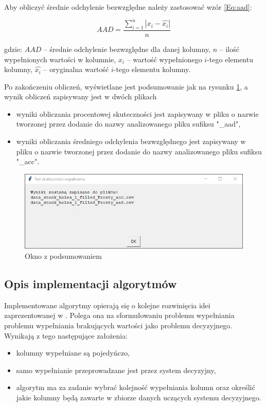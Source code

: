 \documentclass[12pt,twoside]{article}
\begin{document}
Aby obliczyć średnie odchylenie bezwzględne należy zastosować wzór \ref{Eq:aad}:

\begin{equation}
    AAD=\frac{\sum_{i=1}^{n}|x_i - \hat{x_i}|}{n}
    \label{Eq:aad}
\end{equation}

gdzie: $AAD$ -- średnie odchylenie bezwzględne dla danej kolumny,
$n$ -- ilość wypełnionych wartości w kolumnie,
$x_i$ -- wartość wypełnionego $i$-tego elementu kolumny,
$\hat{x_i}$ -- oryginalna wartość $i$-tego elementu kolumny.

Po zakończeniu obliczeń, wyświetlane jest podsumowanie jak na rysunku \ref{Fig:acc_end},
a wynik obliczeń zapisywany jest w dwóch plikach

\begin{itemize}[label=-,labelsep=0.4cm, leftmargin=1.25cm]
    \item wyniki obliczania procentowej skuteczności jest zapisywany w pliku o nazwie
          tworzonej przez dodanie do nazwy analizowanego pliku sufiksu "\_aad",
    \item wyniki obliczania średniego odchylenia bezwzględnego jest zapisywany w pliku o nazwie
          tworzonej przez dodanie do nazwy analizowanego pliku sufiksu "\_acc".
\end{itemize}

\begin{figure}[ht]
    \centering
    \includegraphics[width=12cm]{img/09.jpg}
    \caption{Okno z podsumowaniem}
    \label{Fig:acc_end}
\end{figure}
\FloatBarrier

\subsection{Opis implementacji algorytmów}

Implementowane algorytmy opierają się o kolejne rozwinięcia idei zaprezentowanej w \cite{wybZag}.
Polega ona na sformułowaniu problemu wypełniania problemu wypełniania brakujących wartości jako problemu decyzyjnego.
Wynikają z tego następujące założenia:
\begin{itemize}[label=-,labelsep=0.4cm, leftmargin=1.25cm]
    \item kolumny wypełniane są pojedyńczo,
    \item samo wypełnianie przeprowadzane jest przez system decyzyjny,
    \item algorytm ma za zadanie wybrać kolejność wypełniania kolumn oraz
          określić jakie kolumny będą zawarte w zbiorze danych uczących systemu decyzyjnego.
\end{itemize}
\end{document}
